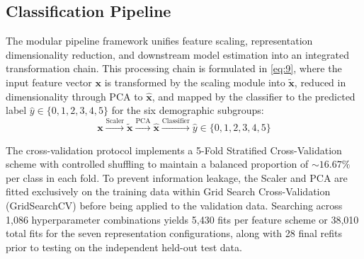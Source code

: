 \subsection{Classification Pipeline}
\label{sec:classification_pipeline}

The modular pipeline framework unifies feature scaling, representation dimensionality reduction, and downstream model estimation into an integrated transformation chain. This processing chain is formulated in \eqref{eq:9}, where the input feature vector $\mathbf{x}$ is transformed by the scaling module into $\tilde{\mathbf{x}}$, reduced in dimensionality through PCA to $\hat{\mathbf{x}}$, and mapped by the classifier to the predicted label $\hat{y} \in \{0, 1, 2, 3, 4, 5\}$ for the six demographic subgroups:
\begin{equation}
\mathbf{x} \xrightarrow{\text{Scaler}} \tilde{\mathbf{x}} \xrightarrow{\text{PCA}} \hat{\mathbf{x}} \xrightarrow{\text{Classifier}} \hat{y} \in \{0, 1, 2, 3, 4, 5\}
\label{eq:9}
\end{equation}

The cross-validation protocol implements a 5-Fold Stratified Cross-Validation scheme with controlled shuffling to maintain a balanced proportion of $\sim 16.67\%$ per class in each fold. To prevent information leakage, the Scaler and PCA are fitted exclusively on the training data within Grid Search Cross-Validation (GridSearchCV) before being applied to the validation data. Searching across 1,086 hyperparameter combinations yields 5,430 fits per feature scheme or 38,010 total fits for the seven representation configurations, along with 28 final refits prior to testing on the independent held-out test data.

